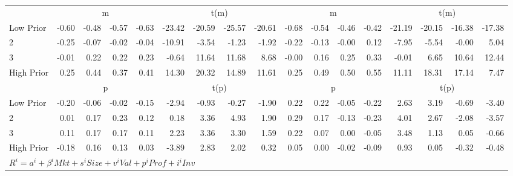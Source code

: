 \begin{table}[!ht]
\begin{tabular}{lrrrrrrrrrrrrrrrr}
  
     & \multicolumn{4}{c}{m} & \multicolumn{4}{c}{t(m)}  & \multicolumn{4}{c}{m} & \multicolumn{4}{c}{t(m)}   \\
     \cmidrule(r){2-5} \cmidrule(r){6-9}  \cmidrule(r){10-13} \cmidrule(r){14-17} 
    Low Prior  & -0.60  & -0.48  & -0.57  & -0.63  & -23.42  & -20.59  & -25.57  & -20.61  & -0.68  & -0.54  & -0.46  & -0.42  & -21.19  & -20.15  & -16.38  & -17.38   \\
    2  & -0.25  & -0.07  & -0.02  & -0.04  & -10.91  & -3.54  & -1.23  & -1.92  & -0.22  & -0.13  & -0.00  & 0.12  & -7.95  & -5.54  & -0.00  & 5.04   \\
    3  & -0.01  & 0.22  & 0.22  & 0.23  & -0.64  & 11.64  & 11.68  & 8.68  & -0.00  & 0.16  & 0.25  & 0.33  & -0.01  & 6.65  & 10.64  & 12.44   \\
    High Prior  & 0.25  & 0.44  & 0.37  & 0.41  & 14.30  & 20.32  & 14.89  & 11.61  & 0.25  & 0.49  & 0.50  & 0.55  & 11.11  & 18.31  & 17.14  & 7.47   \\
    
  
     & \multicolumn{4}{c}{p} & \multicolumn{4}{c}{t(p)}  & \multicolumn{4}{c}{p} & \multicolumn{4}{c}{t(p)}   \\
     \cmidrule(r){2-5} \cmidrule(r){6-9}  \cmidrule(r){10-13} \cmidrule(r){14-17} 
    Low Prior  & -0.20  & -0.06  & -0.02  & -0.15  & -2.94  & -0.93  & -0.27  & -1.90  & 0.22  & 0.22  & -0.05  & -0.22  & 2.63  & 3.19  & -0.69  & -3.40   \\
    2  & 0.01  & 0.17  & 0.23  & 0.12  & 0.18  & 3.36  & 4.93  & 1.90  & 0.29  & 0.17  & -0.13  & -0.23  & 4.01  & 2.67  & -2.08  & -3.57   \\
    3  & 0.11  & 0.17  & 0.17  & 0.11  & 2.23  & 3.36  & 3.30  & 1.59  & 0.22  & 0.07  & 0.00  & -0.05  & 3.48  & 1.13  & 0.05  & -0.66   \\
    High Prior  & -0.18  & 0.16  & 0.13  & 0.03  & -3.89  & 2.83  & 2.02  & 0.32  & 0.05  & 0.00  & -0.02  & -0.09  & 0.93  & 0.05  & -0.32  & -0.48   \\
    
  
  \midrule
  \multicolumn{17}{l}{$R^i=a^i+\beta^iMkt+s^iSize+v^iVal+p^iProf+i^iInv$}  \\
  

\end{tabular}
\end{table}
